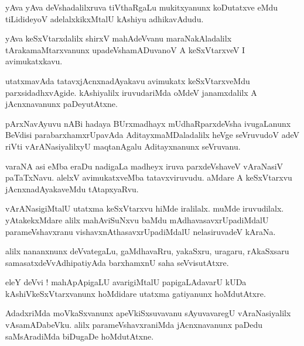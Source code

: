 \documentclass{article}
\begin{document}
\begin{mn}
yAva yAva deVshadalilxruva tiVthaRgaLu mukitxyanunx koDutatxve eMdu tiLidideyoV adelalxkikxMtalU 
kAshiyu adhikavAdudu.
\end{mn}

\begin{mn}
yAva keSxVtarxdalilx shirxV mahAdeVvanu maraNakAladalilx tArakamaMtarxvanunx upadeVshamADuvanoV A 
keSxVtarxveV I avimukatxkavu.
\end{mn}

\begin{mn}
utatxmavAda tatavxjAcnxnadAyakavu avimukatx keSxVtarxveMdu parxsidadhxvAgide. kAshiyalilx 
iruvudariMda oMdeV janamxdalilx A jAcnxnavanunx paDeyutAtxne.
\end{mn}

\begin{mn}
pArxNavAyuvu nABi hadaya BUrxmadhayx mUdhaRparxdeVsha ivugaLanunx BeVdisi parabarxhamxrUpavAda 
AditayxmaMDaladalilx heVge seVruvudoV adeV riVti vArANasiyalilxyU maqtanAgalu Aditayxnanunx 
seVruvanu.
\end{mn}

\begin{mn}
varaNA asi eMba eraDu nadigaLa madheyx iruva parxdeVshaveV vAraNasiV paTaTxNavu. alelxV 
avimukatxveMba tatavxviruvudu. aMdare A keSxVtarxvu jAcnxnadAyakaveMdu tAtapxyaRvu.
\end{mn}

\begin{mn}
vArANasigiMtalU utatxma keSxVtarxvu hiMde iralilalx. muMde iruvudilalx. yAtakekxMdare alilx 
mahAviSuNxvu baMdu mAdhavasavxrUpadiMdalU parameVshavxranu vishavxnAthasavxrUpadiMdalU 
nelasiruvadeV kAraNa. 
\end{mn}

\begin{mn}
alilx nananxnunx deVvategaLu, gaMdhavaRru, yakaSxru, uragaru, rAkaSxsaru samasatxdeVvAdhipatiyAda 
barxhamxnU saha seVvisutAtxre.
\end{mn}

\begin{mn}
eleY deVvi ! mahApApigaLU avarigiMtalU papigaLAdavarU kUDa kAshiVkeSxVtarxvanunx hoMdidare utatxma
gatiyanunx hoMdutAtxre.
\end{mn}

\begin{mn}
AdadxriMda moVkaSxvanunx apeVkiSxsuvavanu sAyuvavaregU vAraNasiyalilx vAsamADabeVku. alilx 
parameVshavxraniMda jAcnxnavanunx paDedu saMsAradiMda biDugaDe hoMdutAtxne.
\end{mn}
\end{document}
